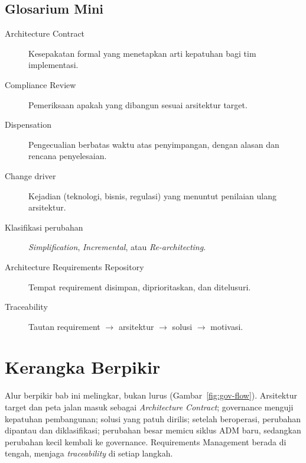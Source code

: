 \subsection*{Glosarium Mini}
\begin{description}
  \item[Architecture Contract] Kesepakatan formal yang menetapkan arti kepatuhan
    bagi tim implementasi.
  \item[Compliance Review] Pemeriksaan apakah yang dibangun sesuai arsitektur
    target.
  \item[Dispensation] Pengecualian berbatas waktu atas penyimpangan, dengan alasan
    dan rencana penyelesaian.
  \item[Change driver] Kejadian (teknologi, bisnis, regulasi) yang menuntut
    penilaian ulang arsitektur.
  \item[Klasifikasi perubahan] \emph{Simplification}, \emph{Incremental}, atau
    \emph{Re-architecting}.
  \item[Architecture Requirements Repository] Tempat requirement disimpan,
    diprioritaskan, dan ditelusuri.
  \item[Traceability] Tautan requirement $\rightarrow$ arsitektur $\rightarrow$
    solusi $\rightarrow$ motivasi.
\end{description}

\section{Kerangka Berpikir}

Alur berpikir bab ini melingkar, bukan lurus (Gambar~\ref{fig:gov-flow}).
Arsitektur target dan peta jalan masuk sebagai \emph{Architecture Contract};
governance menguji kepatuhan pembangunan; solusi yang patuh dirilis; setelah
beroperasi, perubahan dipantau dan diklasifikasi; perubahan besar memicu siklus
ADM baru, sedangkan perubahan kecil kembali ke governance. Requirements Management
berada di tengah, menjaga \emph{traceability} di setiap langkah.

